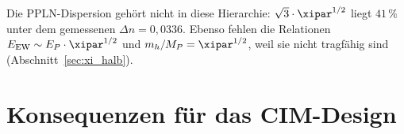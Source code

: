 \begin{table}[H]
    \centering
    \caption{$\xipar^{1/2}$ als elektroschwacher Exponent und weitere
    $\xipar$-Potenzen der T0-Theorie. Die PPLN-Dispersion liegt nicht auf der
    $\xipar^{1/2}$-Stufe (Abschnitt~\ref{sec:hauptergebnis}).}
    \label{tab:universal}
\end{table}

Die PPLN-Dispersion gehört nicht in diese Hierarchie: $\sqrt{3}\cdot\xipar^{1/2}$
liegt $41\,\%$ unter dem gemessenen $\Delta n = 0{,}0336$. Ebenso fehlen die
Relationen $E_\mathrm{EW} \sim E_P\cdot\xipar^{1/2}$ und $m_h/M_P = \xipar^{1/2}$, weil
sie nicht tragfähig sind (Abschnitt~\ref{sec:xi_halb}).

\clearpage

\section{Konsequenzen für das CIM-Design}
\label{sec:konsequenzen}

